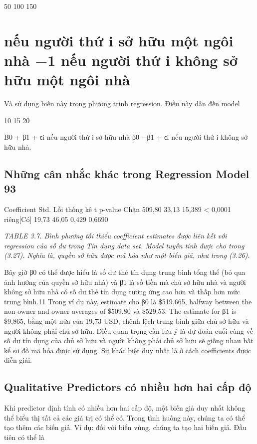 50 100 150

\section{nếu người thứ i sở hữu một ngôi nhà −1 nếu người thứ i không sở hữu một ngôi nhà}

Và sử dụng biến này trong phương trình regression. Điều này dẫn đến model

10 15 20

Β0 + β1 + ϵi nếu người thứ i sở hữu nhà β0 −β1 + ϵi nếu người thứ i không sở hữu nhà.

\subsection{Những cân nhắc khác trong Regression Model 93}

Coefficient Std. Lỗi thống kê t p-value Chặn 509,80 33,13 15,389 < 0,0001 riêng[Có] 19,73 46,05 0,429 0,6690

\noindent\textit{TABLE 3.7. Bình phương tối thiểu coefficient estimates được liên kết với regression của số dư trong Tín dụng data set. Model tuyến tính được cho trong (3.27). Nghĩa là, quyền sở hữu được mã hóa như một biến giả, như trong (3.26).}

Bây giờ β0 có thể được hiểu là số dư thẻ tín dụng trung bình tổng thể (bỏ qua ảnh hưởng của quyền sở hữu nhà) và β1 là số tiền mà chủ sở hữu nhà và người không sở hữu nhà có số dư thẻ tín dụng tương ứng cao hơn và thấp hơn mức trung bình.11 Trong ví dụ này, estimate cho β0 là \$519.665, halfway between the non-owner and owner averages of \$509,80 và \$529.53. The estimate for β1 is \$9,865, bằng một nửa của 19,73 USD, chênh lệch trung bình giữa chủ sở hữu và người không phải chủ sở hữu. Điều quan trọng cần lưu ý là dự đoán cuối cùng về số dư tín dụng của chủ sở hữu và người không phải chủ sở hữu sẽ giống nhau bất kể sơ đồ mã hóa được sử dụng. Sự khác biệt duy nhất là ở cách coefficients được diễn giải.

\subsection{Qualitative Predictors có nhiều hơn hai cấp độ}

Khi predictor định tính có nhiều hơn hai cấp độ, một biến giả duy nhất không thể biểu thị tất cả các giá trị có thể có. Trong tình huống này, chúng ta có thể tạo thêm các biến giả. Ví dụ: đối với biến vùng, chúng ta tạo hai biến giả. Đầu tiên có thể là

